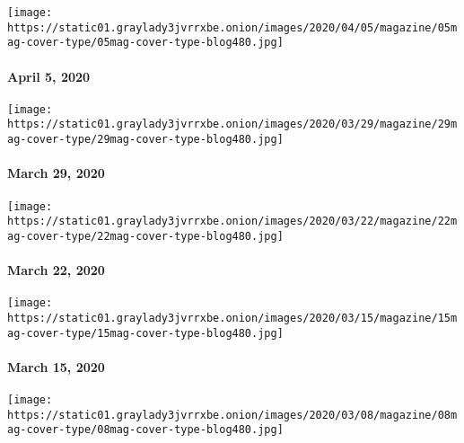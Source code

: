 \href{https://www.nytimes3xbfgragh.onion/issue/magazine/2020/04/03/the-4520-issue}{}

\texttt{[image: https://static01.graylady3jvrrxbe.onion/images/2020/04/05/magazine/05mag-cover-type/05mag-cover-type-blog480.jpg]}

\hypertarget{april-5-2020}{%
\paragraph{April 5, 2020}\label{april-5-2020}}

\href{https://www.nytimes3xbfgragh.onion/issue/magazine/2020/03/27/the-32920-issue}{}

\texttt{[image: https://static01.graylady3jvrrxbe.onion/images/2020/03/29/magazine/29mag-cover-type/29mag-cover-type-blog480.jpg]}

\hypertarget{march-29-2020}{%
\paragraph{March 29, 2020}\label{march-29-2020}}

\href{https://www.nytimes3xbfgragh.onion/issue/magazine/2020/03/19/the-32220-issue}{}

\texttt{[image: https://static01.graylady3jvrrxbe.onion/images/2020/03/22/magazine/22mag-cover-type/22mag-cover-type-blog480.jpg]}

\hypertarget{march-22-2020}{%
\paragraph{March 22, 2020}\label{march-22-2020}}

\href{https://www.nytimes3xbfgragh.onion/interactive/2020/03/11/magazine/best-songs.html\#cover}{}

\texttt{[image: https://static01.graylady3jvrrxbe.onion/images/2020/03/15/magazine/15mag-cover-type/15mag-cover-type-blog480.jpg]}

\hypertarget{march-15-2020}{%
\paragraph{March 15, 2020}\label{march-15-2020}}

\href{https://www.nytimes3xbfgragh.onion/issue/magazine/2020/03/05/the-3820-issue}{}

\texttt{[image: https://static01.graylady3jvrrxbe.onion/images/2020/03/08/magazine/08mag-cover-type/08mag-cover-type-blog480.jpg]}

